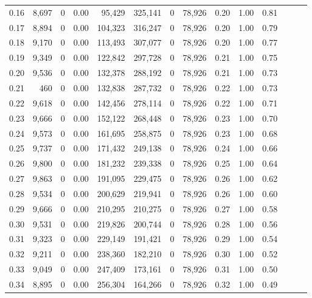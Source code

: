 \begin{tabular}{rrrrrrrrrrrrrr}
0.16 &  8,697 &      0 &  0.00 &   95,429 &  325,141 &       0 &  78,926 &  0.20 &  1.00 &      0.81 \\
0.17 &  8,894 &      0 &  0.00 &  104,323 &  316,247 &       0 &  78,926 &  0.20 &  1.00 &      0.79 \\
0.18 &  9,170 &      0 &  0.00 &  113,493 &  307,077 &       0 &  78,926 &  0.20 &  1.00 &      0.77 \\
0.19 &  9,349 &      0 &  0.00 &  122,842 &  297,728 &       0 &  78,926 &  0.21 &  1.00 &      0.75 \\
0.20 &  9,536 &      0 &  0.00 &  132,378 &  288,192 &       0 &  78,926 &  0.21 &  1.00 &      0.73 \\
0.21 &    460 &      0 &  0.00 &  132,838 &  287,732 &       0 &  78,926 &  0.22 &  1.00 &      0.73 \\
0.22 &  9,618 &      0 &  0.00 &  142,456 &  278,114 &       0 &  78,926 &  0.22 &  1.00 &      0.71 \\
0.23 &  9,666 &      0 &  0.00 &  152,122 &  268,448 &       0 &  78,926 &  0.23 &  1.00 &      0.70 \\
0.24 &  9,573 &      0 &  0.00 &  161,695 &  258,875 &       0 &  78,926 &  0.23 &  1.00 &      0.68 \\
0.25 &  9,737 &      0 &  0.00 &  171,432 &  249,138 &       0 &  78,926 &  0.24 &  1.00 &      0.66 \\
0.26 &  9,800 &      0 &  0.00 &  181,232 &  239,338 &       0 &  78,926 &  0.25 &  1.00 &      0.64 \\
0.27 &  9,863 &      0 &  0.00 &  191,095 &  229,475 &       0 &  78,926 &  0.26 &  1.00 &      0.62 \\
0.28 &  9,534 &      0 &  0.00 &  200,629 &  219,941 &       0 &  78,926 &  0.26 &  1.00 &      0.60 \\
0.29 &  9,666 &      0 &  0.00 &  210,295 &  210,275 &       0 &  78,926 &  0.27 &  1.00 &      0.58 \\
0.30 &  9,531 &      0 &  0.00 &  219,826 &  200,744 &       0 &  78,926 &  0.28 &  1.00 &      0.56 \\
0.31 &  9,323 &      0 &  0.00 &  229,149 &  191,421 &       0 &  78,926 &  0.29 &  1.00 &      0.54 \\
0.32 &  9,211 &      0 &  0.00 &  238,360 &  182,210 &       0 &  78,926 &  0.30 &  1.00 &      0.52 \\
0.33 &  9,049 &      0 &  0.00 &  247,409 &  173,161 &       0 &  78,926 &  0.31 &  1.00 &      0.50 \\
0.34 &  8,895 &      0 &  0.00 &  256,304 &  164,266 &       0 &  78,926 &  0.32 &  1.00 &      0.49 \\

\end{tabular}
